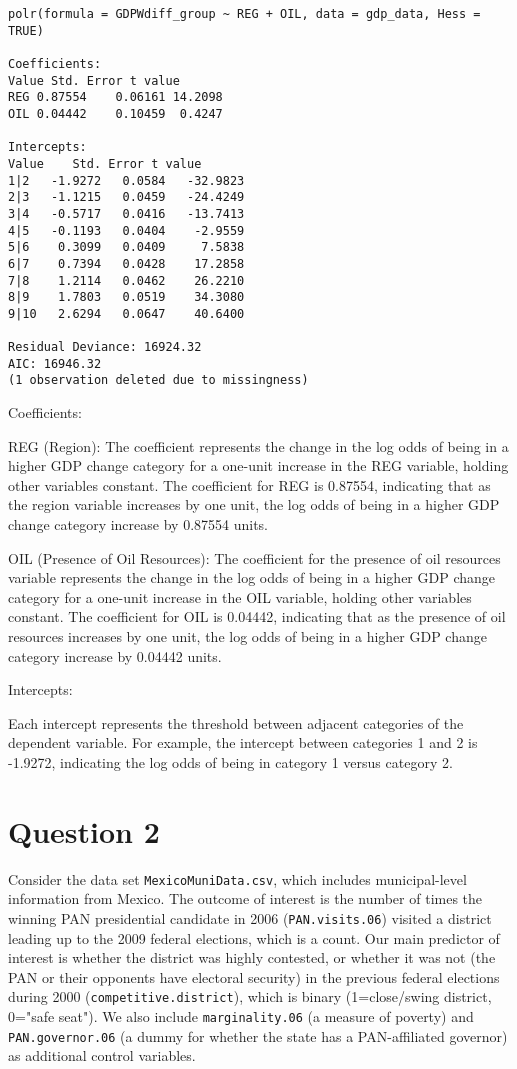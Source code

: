 \documentclass[12pt,letterpaper]{article}
\begin{document}
\begin{verbatim}
polr(formula = GDPWdiff_group ~ REG + OIL, data = gdp_data, Hess = TRUE)

Coefficients:
Value Std. Error t value
REG 0.87554    0.06161 14.2098
OIL 0.04442    0.10459  0.4247

Intercepts:
Value    Std. Error t value 
1|2   -1.9272   0.0584   -32.9823
2|3   -1.1215   0.0459   -24.4249
3|4   -0.5717   0.0416   -13.7413
4|5   -0.1193   0.0404    -2.9559
5|6    0.3099   0.0409     7.5838
6|7    0.7394   0.0428    17.2858
7|8    1.2114   0.0462    26.2210
8|9    1.7803   0.0519    34.3080
9|10   2.6294   0.0647    40.6400

Residual Deviance: 16924.32 
AIC: 16946.32 
(1 observation deleted due to missingness)

\end{verbatim}

Coefficients:

REG (Region): The coefficient represents the change in the log odds of being in a higher GDP change category for a one-unit increase in the REG variable, holding other variables constant. The coefficient for REG is 0.87554, indicating that as the region variable increases by one unit, the log odds of being in a higher GDP change category increase by 0.87554 units.

OIL (Presence of Oil Resources): The coefficient for the presence of oil resources variable represents the change in the log odds of being in a higher GDP change category for a one-unit increase in the OIL variable, holding other variables constant. The coefficient for OIL is 0.04442, indicating that as the presence of oil resources increases by one unit, the log odds of being in a higher GDP change category increase by 0.04442 units.


Intercepts:

Each intercept represents the threshold between adjacent categories of the dependent variable. For example, the intercept between categories 1 and 2 is -1.9272, indicating the log odds of being in category 1 versus category 2.

\newpage	
\section*{Question 2} 
\vspace{.25cm}

\noindent Consider the data set \texttt{MexicoMuniData.csv}, which includes municipal-level information from Mexico. The outcome of interest is the number of times the winning PAN presidential candidate in 2006 (\texttt{PAN.visits.06}) visited a district leading up to the 2009 federal elections, which is a count. Our main predictor of interest is whether the district was highly contested, or whether it was not (the PAN or their opponents have electoral security) in the previous federal elections during 2000 (\texttt{competitive.district}), which is binary (1=close/swing district, 0="safe seat"). We also include \texttt{marginality.06} (a measure of poverty) and \texttt{PAN.governor.06} (a dummy for whether the state has a PAN-affiliated governor) as additional control variables. 
\end{document}
